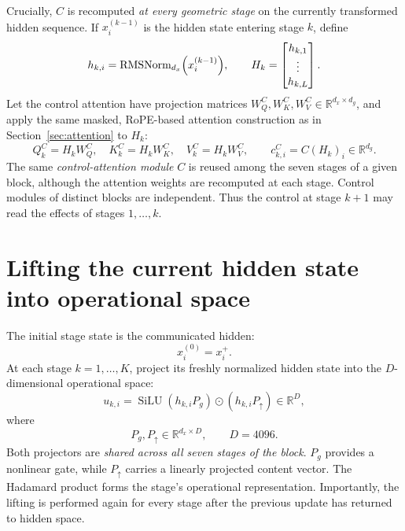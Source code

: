 \documentclass[11pt,a4paper]{article}
\newcommand{\R}{\mathbb{R}}
\newcommand{\rmsn}{\operatorname{RMSNorm}}
\newcommand{\SiLU}{\operatorname{SiLU}}
\newcommand{\up}{{\uparrow}}
\begin{document}
Crucially, $C$ is recomputed \emph{at every geometric stage} on the currently transformed hidden
sequence. If $x_i^{(k-1)}$ is the hidden state entering stage $k$, define
\begin{equation}
h_{k,i}=\rmsn_{d_x}\Bigl(x_i^{(k-1)}\Bigr),\qquad H_k=\begin{bmatrix}h_{k,1}\\ \vdots\\ h_{k,L}\end{bmatrix}.
\end{equation}
Let the control attention have projection matrices $W_Q^C,W_K^C,W_V^C\in\R^{d_x\times d_g}$, and apply the
same masked, RoPE-based attention construction as in Section~\ref{sec:attention} to $H_k$:
\begin{equation}
Q_k^C=H_kW_Q^C,\quad K_k^C=H_kW_K^C,\quad V_k^C=H_kW_V^C,\qquad c_{k,i}^C=C(H_k)_i\in\R^{d_g}.
\end{equation}
The same \emph{control-attention module} $C$ is reused among the seven stages of a given block, although
the attention weights are recomputed at each stage. Control modules of distinct blocks are independent.
Thus the control at stage $k+1$ may read the effects of stages $1,\dots,k$.

\section{Lifting the current hidden state into operational space}

The initial stage state is the communicated hidden:
\begin{equation}
x_i^{(0)}=x_i^{+}.
\end{equation}
At each stage $k=1,\dots,K$, project its freshly normalized hidden state into the $D$-dimensional
operational space:
\begin{equation}
u_{k,i}=\SiLU(h_{k,i}P_g)\odot(h_{k,i}P_\up)\in\R^{D},
\end{equation}
where
\begin{equation}
P_g,P_\up\in\R^{d_x\times D},\qquad D=4096.
\end{equation}
Both projectors are \emph{shared across all seven stages of the block}. $P_g$ provides a nonlinear gate,
while $P_\up$ carries a linearly projected content vector. The Hadamard product forms the stage's
operational representation. Importantly, the lifting is performed again for every stage after the
previous update has returned to hidden space.
\end{document}
